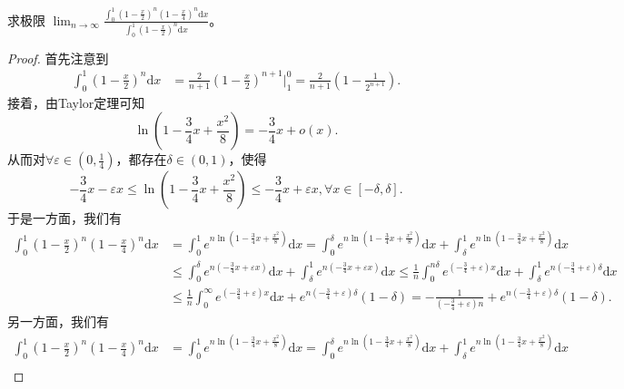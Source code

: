 \documentclass[../../main.tex]{subfiles}%
\begin{document}
\begin{example}
求极限 $\lim_{n\rightarrow \infty} \frac{\int_0^1{\left( 1-\frac{x}{2} \right) ^n\left( 1-\frac{x}{4} \right) ^n\mathrm{d}x}}{\int_0^1{\left( 1-\frac{x}{2} \right) ^n\mathrm{d}x}}$。
\end{example}
\begin{proof}

首先注意到
\begin{align}
\int_0^1{\left( 1-\frac{x}{2} \right) ^n\mathrm{d}x}&=\frac{2}{n+1}\left( 1-\frac{x}{2} \right) ^{n+1}\Big|_{1}^{0}=\frac{2}{n+1}\left( 1-\frac{1}{2^{n+1}} \right) .\label{example-Laplace0.7-0.0}
\end{align}
接着，由Taylor定理可知
\[
\ln \left( 1-\frac{3}{4}x+\frac{x^2}{8} \right) =-\frac{3}{4}x+o\left( x \right) .
\]
从而对$\forall \varepsilon \in \left( 0,\frac{1}{4} \right)$，都存在$\delta \in \left( 0,1 \right)$，使得
\[
-\frac{3}{4}x-\varepsilon x\leqslant \ln \left( 1-\frac{3}{4}x+\frac{x^2}{8} \right) \leqslant -\frac{3}{4}x+\varepsilon x,\forall x\in \left[ -\delta ,\delta \right] .
\]
于是一方面，我们有
\begin{align*}
\int_0^1{\left( 1-\frac{x}{2} \right) ^n\left( 1-\frac{x}{4} \right) ^n\mathrm{d}x}&=\int_0^1{e^{n\ln \left( 1-\frac{3}{4}x+\frac{x^2}{8} \right)}\mathrm{d}x}=\int_0^{\delta}{e^{n\ln \left( 1-\frac{3}{4}x+\frac{x^2}{8} \right)}\mathrm{d}x}+\int_{\delta}^1{e^{n\ln \left( 1-\frac{3}{4}x+\frac{x^2}{8} \right)}\mathrm{d}x}\\
&\leqslant \int_0^{\delta}{e^{n\left( -\frac{3}{4}x+\varepsilon x \right)}\mathrm{d}x}+\int_{\delta}^1{e^{n\left( -\frac{3}{4}x+\varepsilon x \right)}\mathrm{d}x}\leqslant \frac{1}{n}\int_0^{n\delta}{e^{\left( -\frac{3}{4}+\varepsilon \right) x}\mathrm{d}x}+\int_{\delta}^1{e^{n\left( -\frac{3}{4}+\varepsilon \right) \delta}\mathrm{d}x}\\
&\leqslant \frac{1}{n}\int_0^{\infty}{e^{\left( -\frac{3}{4}+\varepsilon \right) x}\mathrm{d}x}+e^{n\left( -\frac{3}{4}+\varepsilon \right) \delta}\left( 1-\delta \right) =-\frac{1}{\left( -\frac{3}{4}+\varepsilon \right) n}+e^{n\left( -\frac{3}{4}+\varepsilon \right) \delta}\left( 1-\delta \right) .
\end{align*}
另一方面，我们有
\begin{align*}
\int_0^1{\left( 1-\frac{x}{2} \right) ^n\left( 1-\frac{x}{4} \right) ^n\mathrm{d}x}&=\int_0^1{e^{n\ln \left( 1-\frac{3}{4}x+\frac{x^2}{8} \right)}\mathrm{d}x}=\int_0^{\delta}{e^{n\ln \left( 1-\frac{3}{4}x+\frac{x^2}{8} \right)}\mathrm{d}x}+\int_{\delta}^1{e^{n\ln \left( 1-\frac{3}{4}x+\frac{x^2}{8} \right)}\mathrm{d}x}\\

\end{align*}
\end{proof}
\end{document}
